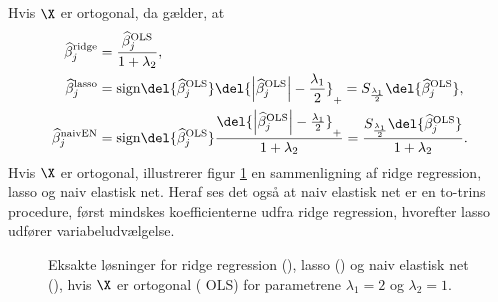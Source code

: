 \begin{lem}
Hvis \(\X\) er ortogonal, da gælder, at
\begin{align}
\widehat{\beta}_j^\text{ridge} &= \frac{\widehat{\beta}_j^\text{OLS}}{1+\lambda_2}, \label{eq:orto_ridge} \\
\widehat{\beta}_j^\text{lasso} &= \text{sign} \del{\widehat{\beta}_j^\text{OLS}} \del{\left\vert \widehat{\beta}_j^\text{OLS} \right\vert - \frac{\lambda_1}{2}}_+ =S_{\frac{\lambda_1}{2}} \del{ \widehat{\beta}_j^\text{OLS}}, \label{eq:orto_lasso} \\
\widehat{\beta}_j^\text{naivEN} &= \text{sign} \del{\widehat{\beta}_j^\text{OLS}} \frac{\del{\left\vert \widehat{\beta}_j^\text{OLS} \right\vert - \frac{\lambda_1}{2}}_+}{1+\lambda_2} = \frac{S_{\frac{\lambda_1}{2}} \del{ \widehat{\beta}_j^\text{OLS}} }{1+\lambda_2} . \label{eq:orto_naivEN}
\end{align}
Hvis \(\X\) er ortogonal, illustrerer figur \ref{fig:elastisk2} en sammenligning af ridge regression, lasso og naiv elastisk net.
Heraf ses det også at naiv elastisk net er en to-trins procedure, først mindskes koefficienterne udfra ridge regression, hvorefter lasso udfører variabeludvælgelse. 
%
\begin{figure}[H]
\centering
\scalebox{0.8}{}
\caption[optional short text]{Eksakte løsninger for ridge regression (), lasso () og naiv elastisk net (), hvis \(\X\) er ortogonal ( OLS) for parametrene \(\lambda_1=2\) og \(\lambda_2=1\).} \label{fig:elastisk2}
\end{figure}
%
\end{lem}
%

